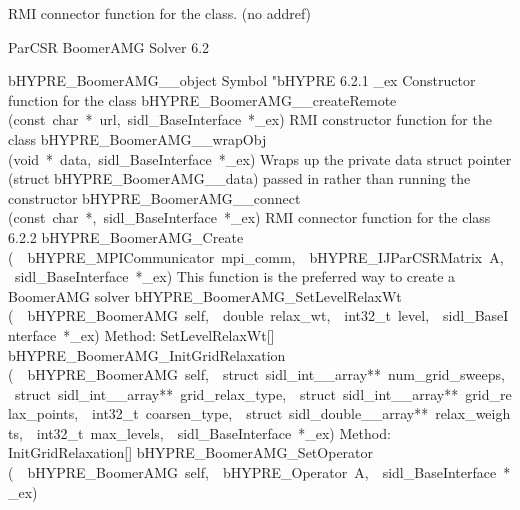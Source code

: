\documentclass{article}
\begin{document}
\begin{cxxentry}
\begin{cxxentry}
\begin{cxxvariable}
\begin{cxxdoc}
RMI connector function for the class. (no addref)
\end{cxxdoc}
\end{cxxvariable}
\end{cxxentry}
\begin{cxxentry}
{}
        {ParCSR BoomerAMG Solver}
        {}
        {
}
        {6.2}
\begin{cxxnames}
        {bHYPRE\_BoomerAMG\_\_object}
        {}
        {
Symbol "bHYPRE}
        {6.2.1}
        {\_ex}
        {}
        {
Constructor function for the class}
        {}
\label{cxx.6.2.11}
        {bHYPRE\_BoomerAMG\_\_createRemote}
        {(const\ char\ *\ url,\ sidl\_BaseInterface\ *\_ex)}
        {
RMI constructor function for the class}
        {}
\label{cxx.6.2.12}
        {bHYPRE\_BoomerAMG\_\_wrapObj}
        {(void\ *\ data,\ sidl\_BaseInterface\ *\_ex)}
        {
Wraps up the private data struct pointer (struct bHYPRE\_BoomerAMG\_\_data) passed in rather than running the constructor}
        {}
\label{cxx.6.2.13}
        {bHYPRE\_BoomerAMG\_\_connect}
        {(const\ char\ *,\ sidl\_BaseInterface\ *\_ex)}
        {
RMI connector function for the class}
        {6.2.2}
        {bHYPRE\_BoomerAMG\_Create}
        {(\ \ bHYPRE\_MPICommunicator\ mpi\_comm,\ \ bHYPRE\_IJParCSRMatrix\ A,\ \ sidl\_BaseInterface\ *\_ex)}
        {
This function is the preferred way to create a BoomerAMG solver}
        {}
\label{cxx.6.2.14}
        {bHYPRE\_BoomerAMG\_SetLevelRelaxWt}
        {(\ \ bHYPRE\_BoomerAMG\ self,\ \ double\ relax\_wt,\ \ int32\_t\ level,\ \ sidl\_BaseInterface\ *\_ex)}
        {
Method:  SetLevelRelaxWt[]}
        {}
\label{cxx.6.2.15}
        {bHYPRE\_BoomerAMG\_InitGridRelaxation}
        {(\ \ bHYPRE\_BoomerAMG\ self,\ \ struct\ sidl\_int\_\_array**\ num\_grid\_sweeps,\ \ struct\ sidl\_int\_\_array**\ grid\_relax\_type,\ \ struct\ sidl\_int\_\_array**\ grid\_relax\_points,\ \ int32\_t\ coarsen\_type,\ \ struct\ sidl\_double\_\_array**\ relax\_weights,\ \ int32\_t\ max\_levels,\ \ sidl\_BaseInterface\ *\_ex)}
        {
Method:  InitGridRelaxation[]}
        {}
\label{cxx.6.2.16}
        {bHYPRE\_BoomerAMG\_SetOperator}
        {(\ \ bHYPRE\_BoomerAMG\ self,\ \ bHYPRE\_Operator\ A,\ \ sidl\_BaseInterface\ *\_ex)}

\end{cxxnames}
\end{cxxentry}
\end{cxxentry}
\end{document}
